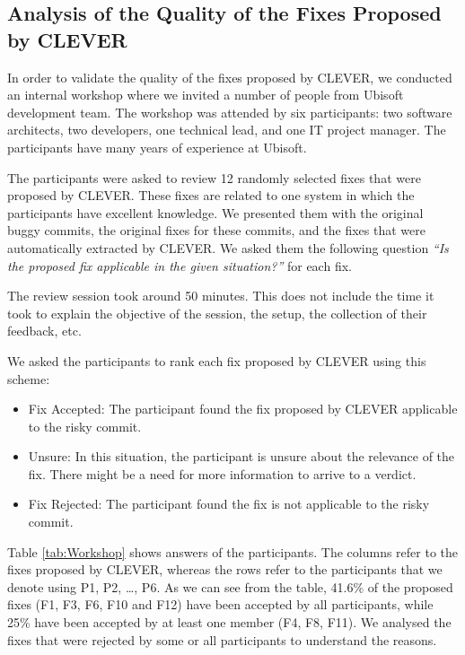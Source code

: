 \documentclass[12pt]{report}
\providecommand{\tightlist}{%
  \setlength{\itemsep}{0pt}\setlength{\parskip}{0pt}}
\begin{document}


\subsection{Analysis of the Quality of the Fixes Proposed by
CLEVER}\label{analysis-of-the-quality-of-the-fixes-proposed-by-clever}

In order to validate the quality of the fixes proposed by CLEVER, we
conducted an internal workshop where we invited a number of people from
Ubisoft development team. The workshop was attended by six participants:
two software architects, two developers, one technical lead, and one IT
project manager. The participants have many years of experience at
Ubisoft.

The participants were asked to review 12 randomly selected fixes that
were proposed by CLEVER. These fixes are related to one system in which
the participants have excellent knowledge. We presented them with the
original buggy commits, the original fixes for these commits, and the
fixes that were automatically extracted by CLEVER. We asked them the
following question \emph{``Is the proposed fix applicable in the given
situation?''} for each fix.

The review session took around 50 minutes. This does not include the
time it took to explain the objective of the session, the setup, the
collection of their feedback, etc.

We asked the participants to rank each fix proposed by CLEVER using this
scheme:

\begin{itemize}
\tightlist
\item
  Fix Accepted: The participant found the fix proposed by CLEVER
  applicable to the risky commit.
\item
  Unsure: In this situation, the participant is unsure about the
  relevance of the fix. There might be a need for more information to
  arrive to a verdict.
\item
  Fix Rejected: The participant found the fix is not applicable to the
  risky commit.
\end{itemize}

Table \ref{tab:Workshop} shows answers of the participants. The columns
refer to the fixes proposed by CLEVER, whereas the rows refer to the
participants that we denote using P1, P2, \ldots{}, P6. As we can see
from the table, 41.6\% of the proposed fixes (F1, F3, F6, F10 and F12)
have been accepted by all participants, while 25\% have been accepted by
at least one member (F4, F8, F11). We analysed the fixes that were
rejected by some or all participants to understand the reasons.
\end{document}
